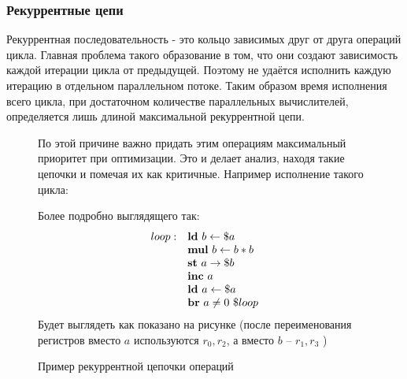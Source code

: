 \documentclass[a4paper,12pt,titlepage]{article}
\begin{document}
\subsubsection{Рекуррентные цепи}
Рекуррентная последовательность - это кольцо зависимых друг от друга операций цикла. Главная проблема такого образование в том, что они создают зависимость каждой итерации цикла от предыдущей. Поэтому не удаётся исполнить каждую итерацию в отдельном параллельном потоке. 
Таким образом время исполнения всего цикла, при достаточном количестве параллельных вычислителей, определяется лишь длиной максимальной рекуррентной цепи. 
\begin{figure}[!!h]
\begin{minipage}[]{0.35\linewidth}
	По этой причине важно придать этим операциям максимальный приоритет при оптимизации. Это и делает анализ, находя такие цепочки и помечая их как критичные.
	Например исполнение такого цикла:
	\begin{algorithmic}
	\Repeat 
	\end{algorithmic}

	Более подробно выглядящего так:
	\[
	\begin{matrix*}[l]
	loop:& \ld b a\\
			&\mul b {b*b}\\
			&\st a b\\
			&\inc a\\
			&\ld a a\\
			&\brnz a {loop}
	\end{matrix*}
	\]
	Будет выглядеть как показано на рисунке (после переименования регистров вместо $a$ используются $r_0, r_2$, а вместо $b$ -- $r_1, r_3$ )
	\vspace{0.5cm}
	\caption{Пример рекуррентной цепочки операций}
\end{minipage}
\hspace{0.05\linewidth}
\begin{minipage}[]{0.4\linewidth}
	\centering
	
\end{minipage}
\label{fig:recurrency}
\end{figure}
\end{document}
